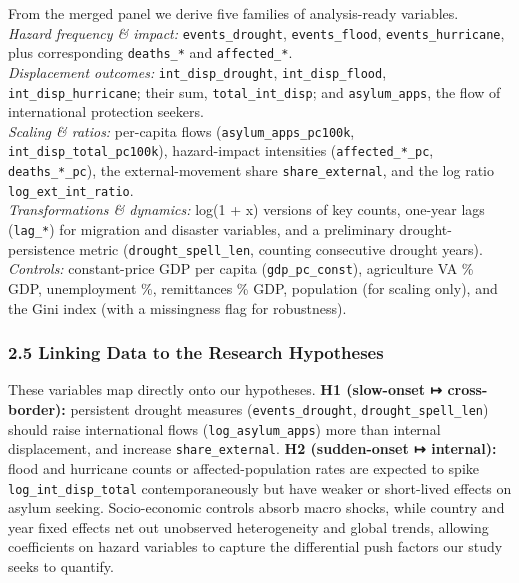\documentclass[
  11pt,
]{article}
\begin{document}
From the merged panel we derive five families of analysis-ready
variables.\\
\emph{Hazard frequency \& impact:} \texttt{events\_drought},
\texttt{events\_flood}, \texttt{events\_hurricane}, plus corresponding
\texttt{deaths\_*} and \texttt{affected\_*}.\\
\emph{Displacement outcomes:} \texttt{int\_disp\_drought},
\texttt{int\_disp\_flood}, \texttt{int\_disp\_hurricane}; their sum,
\texttt{total\_int\_disp}; and \texttt{asylum\_apps}, the flow of
international protection seekers.\\
\emph{Scaling \& ratios:} per-capita flows
(\texttt{asylum\_apps\_pc100k}, \texttt{int\_disp\_total\_pc100k}),
hazard-impact intensities (\texttt{affected\_*\_pc},
\texttt{deaths\_*\_pc}), the external-movement share
\texttt{share\_external}, and the log ratio
\texttt{log\_ext\_int\_ratio}.\\
\emph{Transformations \& dynamics:} log(1 + x) versions of key counts,
one-year lags (\texttt{lag\_*}) for migration and disaster variables,
and a preliminary drought-persistence metric
(\texttt{drought\_spell\_len}, counting consecutive drought years).\\
\emph{Controls:} constant-price GDP per capita
(\texttt{gdp\_pc\_const}), agriculture VA \% GDP, unemployment \%,
remittances \% GDP, population (for scaling only), and the Gini index
(with a missingness flag for robustness).

\subsubsection{2.5 Linking Data to the Research
Hypotheses}\label{linking-data-to-the-research-hypotheses}

These variables map directly onto our hypotheses. \textbf{H1 (slow-onset
↦ cross-border):} persistent drought measures (\texttt{events\_drought},
\texttt{drought\_spell\_len}) should raise international flows
(\texttt{log\_asylum\_apps}) more than internal displacement, and
increase \texttt{share\_external}. \textbf{H2 (sudden-onset ↦
internal):} flood and hurricane counts or affected-population rates are
expected to spike \texttt{log\_int\_disp\_total} contemporaneously but
have weaker or short-lived effects on asylum seeking. Socio-economic
controls absorb macro shocks, while country and year fixed effects net
out unobserved heterogeneity and global trends, allowing coefficients on
hazard variables to capture the differential push factors our study
seeks to quantify.
\end{document}
